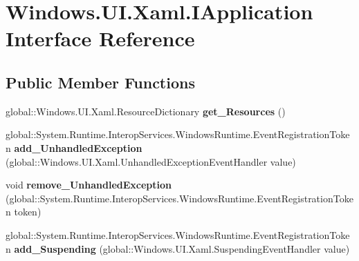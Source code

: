 \hypertarget{interface_windows_1_1_u_i_1_1_xaml_1_1_i_application}{}\section{Windows.\+U\+I.\+Xaml.\+I\+Application Interface Reference}
\label{interface_windows_1_1_u_i_1_1_xaml_1_1_i_application}
\subsection*{Public Member Functions}
\begin{DoxyCompactItemize}
\item 
\mbox{\label{interface_windows_1_1_u_i_1_1_xaml_1_1_i_application_af85326d17430aa8cf53216ec4beb0251}} 
global\+::\+Windows.\+U\+I.\+Xaml.\+Resource\+Dictionary {\bfseries get\+\_\+\+Resources} ()
\item 
\mbox{\label{interface_windows_1_1_u_i_1_1_xaml_1_1_i_application_ae4f5867a120030fd6bfe6cf03786a52d}} 
global\+::\+System.\+Runtime.\+Interop\+Services.\+Windows\+Runtime.\+Event\+Registration\+Token {\bfseries add\+\_\+\+Unhandled\+Exception} (global\+::\+Windows.\+U\+I.\+Xaml.\+Unhandled\+Exception\+Event\+Handler value)
\item 
\mbox{\label{interface_windows_1_1_u_i_1_1_xaml_1_1_i_application_ab5826c25b60c9dc3ea4c0dff5937ea55}} 
void {\bfseries remove\+\_\+\+Unhandled\+Exception} (global\+::\+System.\+Runtime.\+Interop\+Services.\+Windows\+Runtime.\+Event\+Registration\+Token token)
\item 
\mbox{\label{interface_windows_1_1_u_i_1_1_xaml_1_1_i_application_ac0c225619b2deaf238efa786fac50afb}} 
global\+::\+System.\+Runtime.\+Interop\+Services.\+Windows\+Runtime.\+Event\+Registration\+Token {\bfseries add\+\_\+\+Suspending} (global\+::\+Windows.\+U\+I.\+Xaml.\+Suspending\+Event\+Handler value)
\item 
\mbox{\label{interface_windows_1_1_u_i_1_1_xaml_1_1_i_application_a2d065fda78dfbe6343b98c8c19648fcf}} 

\end{DoxyCompactItemize}
